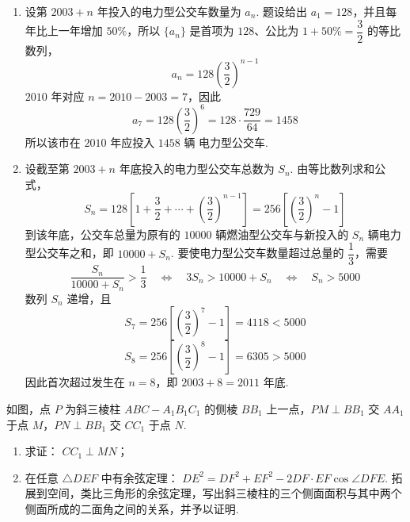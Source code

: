 \begin{solution}
\begin{enumerate}
\item 设第 \(2003+n\) 年投入的电力型公交车数量为 \(a_n\). 题设给出 \(a_1=128\)，并且每年比上一年增加 \(50\%\)，所以 \(\{a_n\}\) 是首项为 \(128\)、公比为 \(1+50\%=\dfrac{3}{2}\) 的等比数列，
\[
a_n=128\left(\frac{3}{2}\right)^{n-1}
\]
\(2010\) 年对应 \(n=2010-2003=7\)，因此
\[
a_7=128\left(\frac{3}{2}\right)^6
=128\cdot\frac{729}{64}=1458
\]
所以该市在 \(2010\) 年应投入 \(1458\text{ 辆}\) 电力型公交车.

\item 设截至第 \(2003+n\) 年底投入的电力型公交车总数为 \(S_n\). 由等比数列求和公式，
\[
S_n=128\left[1+\frac{3}{2}+\cdots+\left(\frac{3}{2}\right)^{n-1}\right]
=256\left[\left(\frac{3}{2}\right)^n-1\right]
\]
到该年底，公交车总量为原有的 \(10000\) 辆燃油型公交车与新投入的 \(S_n\) 辆电力型公交车之和，即 \(10000+S_n\). 要使电力型公交车数量超过总量的 \(\dfrac{1}{3}\)，需要
\[
\frac{S_n}{10000+S_n}>\frac{1}{3}
\quad\Longleftrightarrow\quad
3S_n>10000+S_n
\quad\Longleftrightarrow\quad
S_n>5000
\]
数列 \(S_n\) 递增，且
\[
S_7=256\left[\left(\frac{3}{2}\right)^7-1\right]=4118<5000
\]
\[
S_8=256\left[\left(\frac{3}{2}\right)^8-1\right]=6305>5000
\]
因此首次超过发生在 \(n=8\)，即 \(2003+8=2011\) 年底.
\end{enumerate}
\end{solution}

\begin{problem}
如图，点 \(P\) 为斜三棱柱 \(ABC-A_{1}B_{1}C_{1}\) 的侧棱 \(BB_{1}\) 上一点，\(PM \perp BB_{1}\) 交 \(AA_{1}\) 于点 \(M\)，\(PN \perp BB_{1}\) 交 \(CC_{1}\) 于点 \(N\).

\begin{enumerate}
\item 求证： \(CC_{1} \perp MN\)；
\item 在任意 \(\triangle DEF\) 中有余弦定理： \(DE^2 = DF^2 + EF^2 - 2DF \cdot EF\cos \angle DFE\). 拓展到空间，类比三角形的余弦定理，写出斜三棱柱的三个侧面面积与其中两个侧面所成的二面角之间的关系，并予以证明.
\end{enumerate}

\end{problem}


